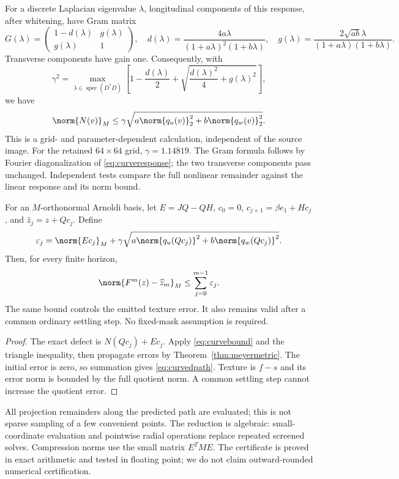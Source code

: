 For a discrete Laplacian eigenvalue $\lambda$, longitudinal components of
this response, after whitening, have Gram matrix
\[
 G(\lambda)=\begin{pmatrix}1-d(\lambda)&g(\lambda)\\g(\lambda)&1\end{pmatrix},
\quad
 d(\lambda)=\frac{4a\lambda}{(1+a\lambda)^2(1+b\lambda)},\quad
 g(\lambda)=\frac{2\sqrt{ab}\lambda}{(1+a\lambda)(1+b\lambda)}.
\]
Transverse components have gain one. Consequently, with
\begin{equation}
 \gamma^2=\max_{\lambda\in\operatorname{spec}(D^*D)}
 \left[1-\frac{d(\lambda)}2+
 \sqrt{\frac{d(\lambda)^2}4+g(\lambda)^2}\right], \label{eq:curvegain}
\end{equation}
we have
\begin{equation}
 \norm{N(v)}_M\leq
 \gamma\sqrt{a\norm{q_u(v)}_2^2+b\norm{q_w(v)}_2^2}.
 \label{eq:curvebound}
\end{equation}
This is a grid- and parameter-dependent calculation, independent of the
source image. For the retained $64\times64$ grid, $\gamma=1.14819$.
The Gram formula follows by Fourier diagonalization of
\eqref{eq:curveresponse}; the two transverse components pass unchanged.
Independent tests compare the full nonlinear remainder against the linear
response and its norm bound.

\begin{theorem}\label{thm:curvedpath}
For an $M$-orthonormal Arnoldi basis, let $E=JQ-QH$,
$c_0=0$, $c_{j+1}=\beta e_1+Hc_j$, and
$\widehat z_j=z+Qc_j$. Define
\[
 \varepsilon_j=\norm{Ec_j}_M+
 \gamma\sqrt{a\norm{q_u(Qc_j)}^2+b\norm{q_w(Qc_j)}^2}.
\]
Then, for every finite horizon,
\begin{equation}
 \norm{F^m(z)-\widehat z_m}_M
 \leq\sum_{j=0}^{m-1}\varepsilon_j. \label{eq:curvedpath}
\end{equation}
The same bound controls the emitted texture error. It also remains valid
after a common ordinary settling step. No fixed-mask assumption is required.
\end{theorem}
\begin{proof}
The exact defect is $N(Qc_j)+Ec_j$. Apply \eqref{eq:curvebound} and the
triangle inequality, then propagate errors by Theorem~\ref{thm:meyermetric}.
The initial error is zero, so summation gives \eqref{eq:curvedpath}.
Texture is $f-s$ and its error norm is bounded by the full quotient norm.
A common settling step cannot increase the quotient error.
\end{proof}

All projection remainders along the predicted path are evaluated; this is
not sparse sampling of a few convenient points. The reduction is algebraic:
small-coordinate evaluation and pointwise radial operations replace repeated
screened solves. Compression norms use the small matrix $E^TME$.
The certificate is proved in exact arithmetic and tested in floating point;
we do not claim outward-rounded numerical certification.


